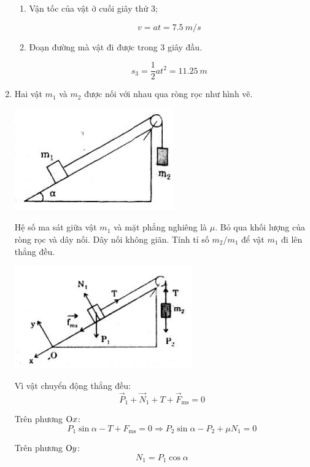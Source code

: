 \begin{enumerate}[label=\bfseries Câu \arabic*:]
{\begin{enumerate}
	Chiếu lên $\text O y$:
	$$N=P=mg$$
	
	Suy ra:
	$$F-\mu m g = ma \Rightarrow a = \SI{2.5}{m/s^2}$$
			\item Vận tốc của vật ở cuối giây thứ 3;
			
	$$v=at = \SI{7.5}{m/s}$$
	
			\item Đoạn đường mà vật đi được trong 3 giây đầu.
			
	$$s_3 = \dfrac{1}{2} at^2 = \SI{11.25}{m}$$
		\end{enumerate}
	}
	\item {}
	
	\cauhoi
	{Hai vật $m_1$ và $m_2$ được nối với nhau qua ròng rọc như hình vẽ.
		\begin{center}
			\includegraphics[scale=1]{../figs/VN10-2021-PH-TP024-1.png}
		\end{center}
	Hệ số ma sát giữa vật $m_1$ và mặt phẳng nghiêng là $\mu$. Bỏ qua khối lượng của ròng rọc và dây nối. Dây nối không giãn. Tính tỉ số $m_2 / m_1$ để vật $m_1$ đi lên thẳng đều.
	}
	
	\loigiai
	{		\begin{center}
			\includegraphics[scale=1.2]{../figs/VN10-2021-PH-TP024-2.png}
		\end{center}
		
		Vì vật chuyển động thẳng đều:
		$$\vec P_1 + \vec N_1 + T + \vec F_\text{ms} = 0$$
		
		Trên phương $\text Ox$:
		$$P_1 \sin \alpha - T + F_\text{ms} = 0 \Rightarrow P_2 \sin \alpha - P_2 + \mu N_1 = 0$$
		
		Trên phương $\text Oy$:
		$$N_1 = P_1 \cos \alpha$$
		
}
\end{enumerate}
